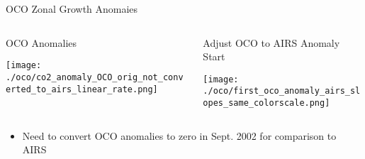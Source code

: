 \documentclass[10pt,t]{beamer}
\begin{document}
\begin{frame}[label={sec:org6d2addd}]{OCO Zonal Growth Anomaies}
\begin{columns}
\begin{column}{0.55\columnwidth}
\begin{block}{OCO Anomalies}
\begin{center}
\texttt{[image: ./oco/co2\_anomaly\_OCO\_orig\_not\_converted\_to\_airs\_linear\_rate.png]}
\end{center}
\end{block}
\end{column}

\begin{column}{0.55\columnwidth}
\begin{block}{Adjust OCO to AIRS Anomaly Start}
\begin{center}
\texttt{[image: ./oco/first\_oco\_anomaly\_airs\_slopes\_same\_colorscale.png]}
\end{center}
\end{block}
\end{column}
\end{columns}

\begin{itemize}
\item Need to convert OCO anomalies to zero in Sept. 2002 for comparison to AIRS
\end{itemize}
\end{frame}
\end{document}
